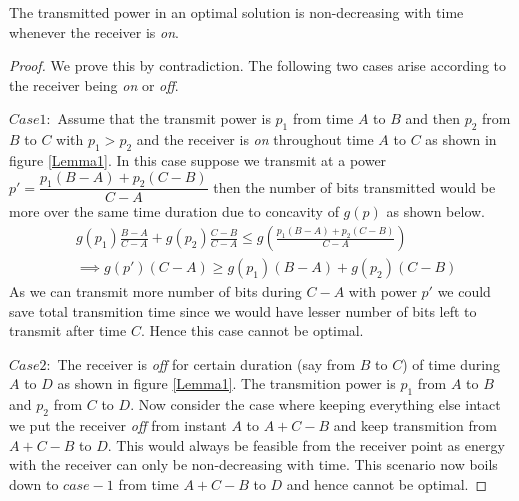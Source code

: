 \begin{lemma}
The transmitted power in an optimal solution is non-decreasing with time whenever the receiver is \textit{on}.
\label{increasing_power}
\end{lemma}
\begin{proof}
We prove this by contradiction. The following two cases arise according to the receiver being \textit{on} or \textit{off}.

$Case1:$ Assume that the transmit power is $p_1$ from time $A$ to $B$ and then $p_2$ from $B$ to $C$ with $p_1>p_2$ and the receiver is \textit{on} throughout time $A$ to $C$ as shown in figure \ref{Lemma1}. In this case suppose we transmit at a power $p'=\dfrac{p_1(B-A)+p_2(C-B)}{C-A}$ then the number of bits transmitted would be more over the same time duration due to concavity of $g(p)$ as shown below.
\begin{align}
&g(p_1)\frac{B-A}{C-A}+g(p_2)\frac{C-B}{C-A} \le g(\frac{p_1(B-A)+p_2(C-B)}{C-A})
\\
&\implies g(p')(C-A)\ge g(p_1)(B-A)+g(p_2)(C-B)  
\end{align}
As we can transmit more number of bits during $C-A$ with power $p'$ we could save total transmition time since we would have lesser number of bits left to transmit after time $C$. Hence this case cannot be optimal.

$Case2:$ The receiver is \textit{off} for certain duration (say from $B$ to $C$) of time during $A$ to $D$ as shown in figure \ref{Lemma1}. The transmition power is $p_1$ from $A$ to $B$ and $p_2$ from $C$ to $D$. Now consider the case where keeping everything else intact we put the receiver \textit{off} from instant $A$ to $A+C-B$ and keep transmition from $A+C-B$ to $D$. This would always be feasible from the receiver point as energy with the receiver can only be non-decreasing with time. This scenario now boils down to $case-1$ from time $A+C-B$ to $D$ and hence cannot be optimal.
\end{proof}

